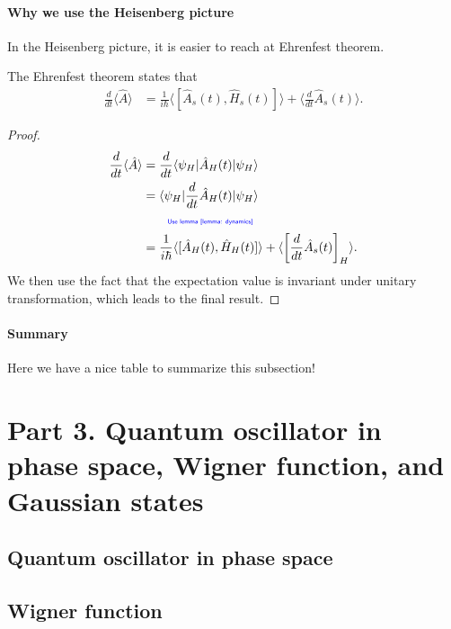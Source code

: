 \documentclass[../../note.tex]{subfiles}
\begin{document}
\paragraph{Why we use the Heisenberg picture}
In the Heisenberg picture, it is easier to reach at Ehrenfest theorem.
\begin{theorem}
    The Ehrenfest theorem states that
    \begin{align}
        \frac{d}{d t} \langle \hat{A} \rangle
        &= \frac{1}{i \hbar} \langle [\hat{A}_s(t), \hat{H}_s(t)] \rangle + \langle \frac{d}{d t} \hat{A}_s(t) \rangle.
    \end{align}
\end{theorem}
\begin{proof}
    \begin{align}
        \frac{d}{d t} \langle \hat{A} \rangle
        &= \frac{d}{d t} \langle \psi_H \vert \hat{A}_H(t)\vert \psi_H \rangle \\
        &= \langle \psi_H \vert \frac{d}{d t} \hat{A}_H(t)\vert \psi_H \rangle \\
        &\qquad\text{\color{blue}{\tiny\sffamily Use lemma \ref{lemma: dynamics}}} \nonumber \\
        &= \frac{1}{i \hbar} \langle [\hat{A}_H(t), \hat{H}_H(t)] \rangle + \langle \left[\frac{d}{d t} \hat{A}_s(t)\right]_H \rangle.
    \end{align}
    We then use the fact that the expectation value is invariant under unitary transformation, which leads to the final result.
\end{proof}

\paragraph{Summary}
Here we have a nice table to summarize this subsection!

\section{Part 3. Quantum oscillator in phase space, Wigner function, and Gaussian states}
\subsection{Quantum oscillator in phase space}
\subsection{Wigner function}
\end{document}
